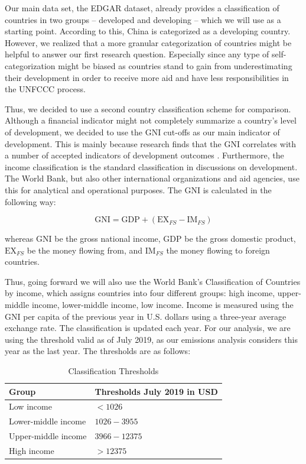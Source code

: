 \documentclass[
  12pt,
]{article}
\numberwithin{equation}{section}
\numberwithin{table}{section}
\numberwithin{figure}{section}
\begin{document}
Our main data set, the EDGAR dataset, already provides a classification
of countries in two groups -- developed and developing -- which we will
use as a starting point. According to this, China is categorized as a
developing country. However, we realized that a more granular
categorization of countries might be helpful to answer our first
research question. Especially since any type of self-categorization
might be biased as countries stand to gain from underestimating their
development in order to receive more aid and have less responsibilities
in the UNFCCC process.

Thus, we decided to use a second country classification scheme for
comparison. Although a financial indicator might not completely
summarize a country's level of development, we decided to use the GNI
cut-offs as our main indicator of development. This is mainly because
research finds that the GNI correlates with a number of accepted
indicators of development outcomes \citep{Fantom2016}. Furthermore, the
income classification is the standard classification in discussions on
development. The World Bank, but also other international organizations
and aid agencies, use this for analytical and operational purposes. The
GNI is calculated in the following way:

\[\text{GNI} = \text{GDP} + \left (\text{EX}_{FS} - \text{IM}_{FS} \right )\]

whereas \(\text{GNI}\) be the gross national income, \(\text{GDP}\) be
the gross domestic product, \(\text{EX}_{FS}\) be the money flowing
from, and \(\text{IM}_{FS}\) the money flowing to foreign countries.

Thus, going forward we will also use the World Bank's Classification of
Countries by income, which assigns countries into four different groups:
high income, upper-middle income, lower-middle income, low income.
Income is measured using the GNI per capita of the previous year in U.S.
dollars using a three-year average exchange rate. The classification is
updated each year. For our analysis, we are using the threshold valid as
of July 2019, as our emissions analysis considers this year as the last
year. The thresholds are as follows:

\begin{table}[!ht]
    \centering
    \begin{tabular}{|l|l|}
    \hline
        \textbf{Group  } & \textbf{Thresholds July 2019 in USD  } \\ \hline
        Low income   & $< 1026$ \\ \hline
        Lower-middle income   & $1026 - 3955$ \\ \hline
        Upper-middle income  & $3966 - 12375$ \\ \hline
        High income  & $> 12375$ \\ \hline
    \end{tabular}
    \caption{Classification Thresholds\label{tbl:x}}
\end{table}
\end{document}
